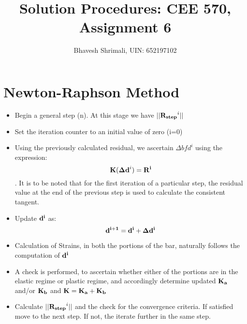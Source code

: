 \documentclass[11pt]{article}
\title{\bf Solution Procedures: CEE 570, Assignment 6}
\author{Bhavesh Shrimali, UIN: 652197102}
\begin{document}
\section{Newton-Raphson Method}
\setlength\parindent{0pt}
\begin{itemize}
\item Begin a general step (n). At this stage we have $||{\bf R_{step}}^i||$
\item Set the iteration counter to an initial value of zero (i=0)
\item Using the previously calculated residual, we ascertain $\Delta {bf d}^i$ using the expression: $${\bf K}({\bf \Delta d}^i)=\bf R^i$$. It is to be noted that for the first iteration of a particular step, the residual value at the end of the previous step is used to calculate the consistent tangent.
\item Update ${\bf d^i}$ as: $$\bf d^{i+1}=d^{i}+\Delta d^i$$
\item Calculation of Strains, in both the portions of the bar, naturally follows the computation of $\bf d^i$
\item A check is performed, to ascertain whether either of the portions are in the elastic regime or plastic regime, and accordingly determine updated $\bf K_a$ and/or $\bf K_b$ and $\bf K=K_a+K_b$
\item Calculate $||{\bf R_{step}}^i||$ and the check for the convergence criteria. If satisfied move to the next step. If not, the iterate further in the same step.\\ 
\end{itemize}
\end{document}

